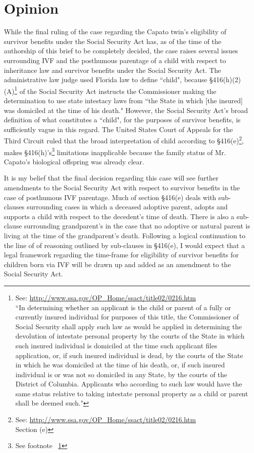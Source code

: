 \documentclass[letterpaper,10pt]{article}
\begin{document}
\section*{Opinion}
While the final ruling of the case regarding the Capato twin's eligibility of survivor benefits under the Social Security Act has, as of the time of the authorship of this brief to be completely decided, the case raises several issues surrounding IVF and the posthumous parentage of a child with respect to inheritance law and survivor benefits under the Social Security Act. The administrative law judge used Florida law to define ``child", because \S 416(h)(2)(A)\footnote{\label{A}See: \url{http://www.ssa.gov/OP_Home/ssact/title02/0216.htm}\\``In determining whether an applicant is the child or parent of a fully or currently insured individual for purposes of this title, the Commissioner of Social Security shall apply such law as would be applied in determining the devolution of intestate personal property by the courts of the State in which such insured individual is domiciled at the time such applicant files application, or, if such insured individual is dead, by the courts of the State in which he was domiciled at the time of his death, or, if such insured individual is or was not so domiciled in any State, by the courts of the District of Columbia. Applicants who according to such law would have the same status relative to taking intestate personal property as a child or parent shall be deemed such."} of the Social Security Act instructs the Commissioner making the determination to use state intestacy laws from ``the State in which [the insured] was domiciled at the time of his death."  However, the Social Security Act's broad definition of what constitutes a ``child", for the purposes of survivor benefits, is sufficiently vague in this regard.  The United States Court of Appeals for the Third Circuit ruled that the broad interpretation of child according to \S 416(e)\footnote{See: \url{http://www.ssa.gov/OP_Home/ssact/title02/0216.htm}\\Section (e)}, makes \S 416(h)'s\footnote{See footnote ~\ref{A}} limitations inapplicable because the family status of Mr. Capato's biological offspring was already clear.

It is my belief that the final  decision regarding this case will see further amendments to the Social Security Act with respect to survivor benefits in the case of posthumous IVF parentage.  Much of section \S 416(e) deals with sub-clauses surrounding cases in which a deceased adoptive parent, adopts and supports a child with respect to the decedent's time of death.  There is also a sub-clause surrounding grandparent's in the case that no adoptive or natural parent is living at the time of the grandparent's death.  Following a logical continuation to the line of of reasoning outlined by sub-clauses in \S 416(e), I would expect that a legal framework regarding the time-frame for eligibility of survivor benefits for children born via IVF will be drawn up and added as an amendment to the Social Security Act.
\end{document}
